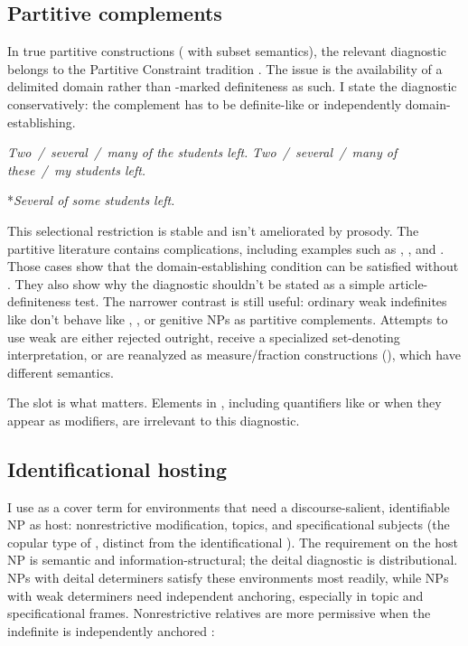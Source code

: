 \documentclass[12pt,letterpaper]{article}
\DeclareRobustCommand{\upslash}{\/\textup{~\slash~}}
\begin{document}
\subsection{Partitive complements}

In true partitive constructions ( with subset semantics), the relevant diagnostic belongs to the Partitive Constraint tradition \parencite{ladusaw1982,abbott1996,Barker1998,Hoeksema1996}. The issue is the availability of a delimited domain rather than -marked definiteness as such. I state the diagnostic conservatively: the  complement has to be definite-like or independently domain-establishing.

\ea 
\label{ex:part-good}
    \ea \textit{Two\upslash several\upslash many of the students left.}
    \ex \textit{Two\upslash several\upslash many of these\upslash my students left.}
    \z
\z

\ea 
\label{ex:part-bad}
*\textit{Several of some students left.}
\z

\noindent This selectional restriction is stable and isn't ameliorated by prosody. The partitive literature contains complications, including examples such as , , and  \parencite{ladusaw1982,abbott1996}. Those cases show that the domain-establishing condition can be satisfied without . They also show why the diagnostic shouldn't be stated as a simple article-definiteness test. The narrower contrast is still useful: ordinary weak indefinites like  don't behave like , , or genitive NPs as partitive complements. Attempts to use weak  are either rejected outright, receive a specialized set-denoting interpretation, or are reanalyzed as measure/fraction constructions (), which have different semantics.

The  slot is what matters. Elements in , including quantifiers like  or  when they appear as modifiers, are irrelevant to this diagnostic.

\subsection{Identificational hosting}

I use  as a cover term for environments that need a discourse-salient, identifiable NP as host: nonrestrictive modification,  topics, and specificational subjects (the copular type of , distinct from the identificational ). The requirement on the host NP is semantic and information-structural; the deital diagnostic is distributional. NPs with deital determiners satisfy these environments most readily, while NPs with weak determiners need independent anchoring, especially in topic and specificational frames. Nonrestrictive relatives are more permissive when the indefinite is independently anchored \parencite{Lambrecht1994}:
\end{document}
